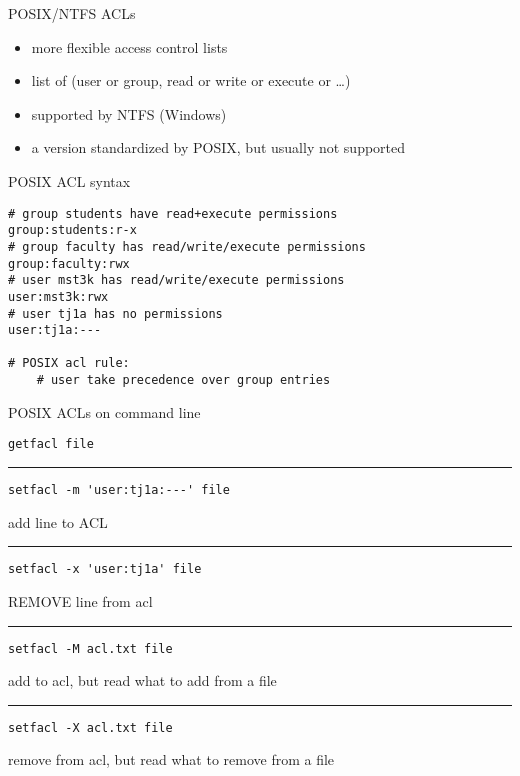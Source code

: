 \begin{frame}{POSIX/NTFS ACLs}
    \begin{itemize}
    \item more flexible access control lists
    \vspace{.5cm}
    \item list of (user or group, read or write or execute or \ldots)
    \vspace{.5cm}
    \item supported by NTFS (Windows)
    \item a version standardized by POSIX, but usually not supported
    \end{itemize}
\end{frame}

\begin{frame}[fragile,label=posixAclSyntax]{POSIX ACL syntax}
\begin{lstlisting}[language={},style=small]
# group students have read+execute permissions
group:students:r-x
# group faculty has read/write/execute permissions
group:faculty:rwx
# user mst3k has read/write/execute permissions
user:mst3k:rwx
# user tj1a has no permissions
user:tj1a:---

# POSIX acl rule:
    # user take precedence over group entries
\end{lstlisting}
\end{frame}

\begin{frame}[fragile]{POSIX ACLs on command line}
\begin{Verbatim}
getfacl file
\end{Verbatim}
    \vspace{.1cm}
\hrule
\begin{Verbatim}
setfacl -m 'user:tj1a:---' file
\end{Verbatim}
add line to ACL
    \vspace{.1cm}
\hrule
\begin{Verbatim}
setfacl -x 'user:tj1a' file
\end{Verbatim}
REMOVE line from acl
    \vspace{.1cm}
\hrule
\begin{Verbatim}
setfacl -M acl.txt file
\end{Verbatim}
add to acl, but read what to add from a file
    \vspace{.1cm}
\hrule
\begin{Verbatim}
setfacl -X acl.txt file
\end{Verbatim}
remove from acl, but read what to remove from a file
    \vspace{.1cm}
\end{frame}
